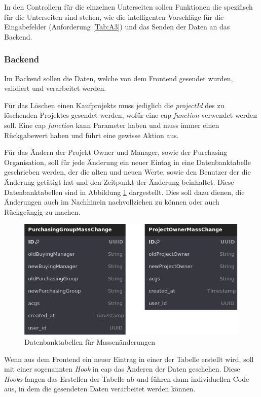 In den Controllern für die einzelnen Unterseiten sollen Funktionen die spezifisch für die Unterseiten sind stehen, wie die intelligenten Vorschläge für die Eingabefelder (Anforderung \ref{Tab:A3}) und das Senden der Daten an das Backend.

\subsubsection[Backend]{Backend}
Im Backend sollen die Daten, welche von dem Frontend gesendet wurden, validiert und verarbeitet werden.

Für das Löschen einen Kaufprojekts muss jediglich die \textit{projectId} des zu löschenden Projektes gesendet werden, wofür eine \gls{cap} \textit{function} verwendet werden soll.
Eine \gls{cap} \textit{function} kann Parameter haben und muss immer einen Rückgabewert haben und führt eine gewisse Aktion aus.

Für das Ändern der Projekt Owner und Manager, sowie der Purchasing Organisation, soll für jede Änderung ein neuer Eintag in eine Datenbanktabelle geschrieben werden, der die alten und neuen Werte, sowie den Benutzer der die Änderung getätigt hat und den Zeitpunkt der Änderung beinhaltet.
Diese Datenbanktabellen sind in Abbildung \ref{fig:masschangetables} dargestellt.
Dies soll dazu dienen, die Änderungen auch im Nachhinein nachvollziehen zu können oder auch Rückgeängig zu machen. 

\begin{figure}[H]
    \centering
    \includegraphics[width=.6\linewidth]{Images/MassChangeTables.png}
    \caption[Datenbanktabellen für Massenänderungen]{Datenbanktabellen für Massenänderungen}
    \label{fig:masschangetables}
\end{figure}

Wenn aus dem Frontend ein neuer Eintrag in einer der Tabelle erstellt wird, soll mit einer sogenannten \textit{Hook} in \gls{cap} das Änderen der Daten geschehen.
Diese \textit{Hooks} fangen das Erstellen der Tabelle ab und führen dann individuellen Code aus, in dem die gesendeten Daten verarbeitet werden können.

